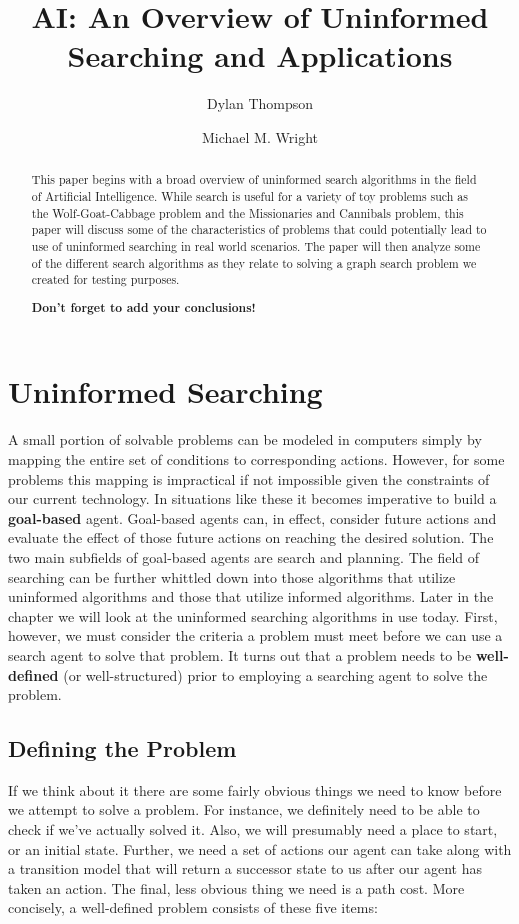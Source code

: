 \documentclass[a4paper,11pt]{report}
\title{AI: An Overview of Uninformed Searching and Applications}
\author{Dylan Thompson \and Michael M. Wright}
\begin{document}
\maketitle
\tableofcontents

\begin{abstract}
This paper begins with a broad overview of uninformed search algorithms in the
field of Artificial Intelligence.  While search is useful for a variety of toy
problems such as the Wolf-Goat-Cabbage problem and the Missionaries and
Cannibals problem, this paper will discuss some of the characteristics of
problems that could potentially lead to use of uninformed searching in real
world scenarios.  The paper will then analyze some of the different search
algorithms as they relate to solving a graph search problem we created for
testing purposes.

\textbf{Don't forget to add your conclusions!}

\end{abstract}

\chapter{Uninformed Searching}
A small portion of solvable problems can be modeled in computers simply by
mapping the entire set of conditions to corresponding actions.  However, for
some problems this mapping is impractical if not impossible given the
constraints of our current technology.  In situations like these it becomes
imperative to build a \textbf{goal-based} agent.  Goal-based agents can, in
effect, consider future actions and evaluate the effect of those future
actions on reaching the desired solution.\cite{norvig}  The two main
subfields of goal-based agents are search and planning.\cite{wikiAgent} The
field of searching can be further whittled down into those algorithms that
utilize uninformed algorithms and those that utilize informed algorithms.
Later in the chapter we will look at the uninformed searching algorithms in
use today.  First, however, we must consider the criteria a problem must meet
before we can use a search agent to solve that problem.  It turns out that a
problem needs to be \textbf{well-defined} (or well-structured) prior to 
employing a searching agent to solve the problem.\cite{shun}

\section{Defining the Problem}
If we think about it there are some fairly obvious things we need to know
before we attempt to solve a problem.  For instance, we definitely need to be
able to check if we've actually solved it.  Also, we will presumably need a
place to start, or an initial state. Further, we need a set of actions our
agent can take along with a transition model that will return a successor state
to us after our agent has taken an action.  The final, less obvious thing we
need is a path cost.  \cite{norvig}  More concisely, a well-defined problem
consists of these five items:
\end{document}
